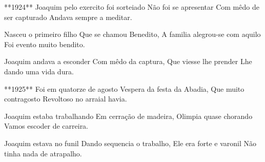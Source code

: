\documentclass{article}
\begin{document}
\begin{poem}
	\begin{stanza}
    **1924**                            \verseline
    Joaquim pelo exercito foi sorteiado \verseline
    Não foi se apresentar               \verseline
    Com mêdo de ser capturado           \verseline
    Andava sempre a meditar.
  \end{stanza}
\end{poem}

\begin{poem}
	\begin{stanza}
    Nasceu o primeiro filho         \verseline
    Que se chamou Benedito,         \verseline
    A familia alegrou-se com aquilo \verseline
    Foi evento muito bendito.
  \end{stanza}
\end{poem}

\begin{poem}
	\begin{stanza}
    Joaquim andava a esconder \verseline
    Com mêdo da captura,      \verseline
    Que viesse lhe prender    \verseline
    Lhe dando uma vida dura.
  \end{stanza}
\end{poem}

\begin{poem}
	\begin{stanza}
    **1925**                    \verseline
    Foi em quatorze de agosto   \verseline
    Vespera da festa da Abadia, \verseline
    Que muito contragosto       \verseline
    Revoltoso no arraial havia.
  \end{stanza}
\end{poem}

\begin{poem}
	\begin{stanza}
    Joaquim estaba trabalhando \verseline
    Em cerração de madeira,    \verseline
    Olimpia quase chorando     \verseline
    Vamos escoder de carreira.
  \end{stanza}
\end{poem}

\begin{poem}
	\begin{stanza}
    Joaquim estava no funil     \verseline
    Dando sequencia o trabalho, \verseline
    Ele era forte e varonil     \verseline
    Não tinha nada de atrapalho.
  \end{stanza}
\end{poem}
\end{document}
